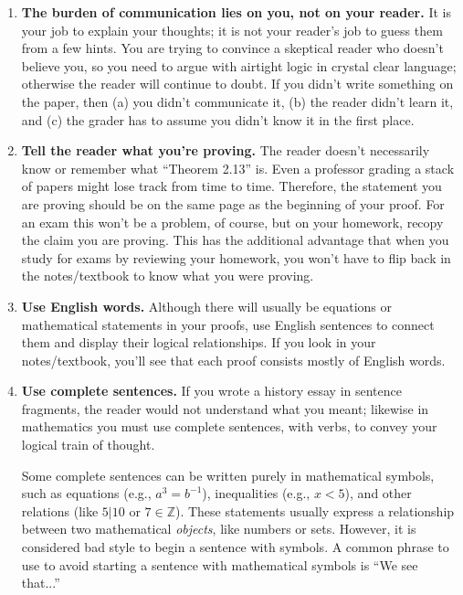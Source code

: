 \begin{enumerate}

\item \textbf{The burden of communication lies on you, not on your reader.}
        It is your job to explain your thoughts;
        it is not your reader's job to guess them from a few hints.
        You are trying to convince a skeptical reader who doesn't believe you,
        so you need to argue with airtight logic in crystal clear language;
        otherwise the reader will continue to doubt.
        If you didn't write something on the paper, then
          (a) you didn't communicate it,
          (b) the reader didn't learn it, and
          (c) the grader has to assume you didn't know it in the first place.
          
\item \textbf{Tell the reader what you're proving.}
        The reader doesn't necessarily know or remember what ``Theorem 2.13'' is.
        Even a professor grading a stack of papers might lose track from time to time.
        Therefore, the statement you are proving should be on the same page as the beginning of your proof.
        For an exam this won't be a problem, of course,
        but on your homework, recopy the claim you are proving.
        This has the additional advantage that when you study for exams by reviewing your homework,
        you won't have to flip back in the notes/textbook to know what you were proving.

\item \textbf{Use English words.}
        Although there will usually be equations or mathematical statements in your proofs,
        use English sentences to connect them and display their logical relationships.
        If you look in your notes/textbook, you'll see that each proof consists mostly of English words.

\item \textbf{Use complete sentences.}
        If you wrote a history essay in sentence fragments,
        the reader would not understand what you meant;
        likewise in mathematics you must use complete sentences, with verbs,
        to convey your logical train of thought.
        
        Some complete sentences can be written purely in mathematical symbols, 
        such as 
          equations (e.g., $a^3=b^{-1}$),
          inequalities (e.g., $x<5$),
          and other relations (like $5\big|10$ or $7\in\mathbb{Z}$).
        These statements usually express a relationship between two mathematical \emph{objects},
        like numbers or sets.  However, it is considered bad style to begin a sentence with symbols.  A common phrase to use to avoid starting a sentence with mathematical symbols is ``We see that...''


\end{enumerate}
